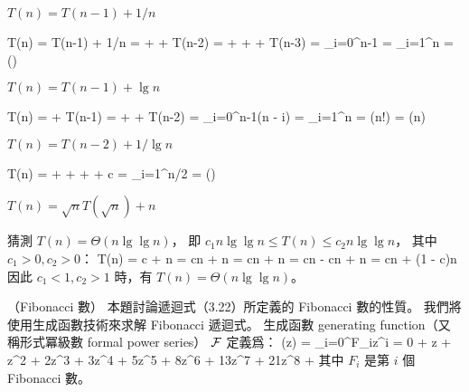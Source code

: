 \item $T(n) = T(n - 1) + 1/n$

\startANSWER
\startformula\startmathalignment
\NC T(n) \NC= T(n-1) + 1/n \NR
\NC      \NC=  +  + T(n-2) \NR
\NC      \NC=  +  +  + T(n-3) \NR
\NC      \NC= \sum_{i=0}^{n-1} \NR
\NC      \NC= \sum_{i=1}^n \NR
\NC      \NC= \Theta()
\stopmathalignment\stopformula
\stopANSWER

\item $T(n) = T(n - 1) + \lg{n}$

\startANSWER
\startformula\startmathalignment
\NC T(n) \NC=  + T(n-1) \NR
\NC      \NC=  +  + T(n-2) \NR
\NC      \NC= \sum_{i=0}^{n-1}\lg(n - i) \NR
\NC      \NC= \sum_{i=1}^{n} \NR
\NC      \NC= \lg(n!) \NR
\NC      \NC= \Theta(n) \qquad {} \NR
\stopmathalignment\stopformula
\stopANSWER

\item $T(n) = T(n - 2) + 1/\lg n$

\startANSWER
\startformula\startmathalignment
\NC T(n) \NC=  +  + \cdots +  + c\NR
\NC      \NC= \sum_{i=1}^{n/2} \NR
\NC      \NC= \Theta(\lg{}) \NR
\stopmathalignment\stopformula
\stopANSWER

\item $T(n) = \sqrt{n}T(\sqrt{n}) + n$

\startANSWER
猜測 $T(n)=\Theta(n\lg\lg n)$，
即 $c_1 n\lg\lg n\le T(n) \le c_2 n\lg\lg{n}$，
其中 $c_1>0,c_2>0$：
\startformula\startmathalignment
\NC T(n) \NC= c\lg\lg{} + n \NR
\NC      \NC= cn\lg\lg{} + n \NR
\NC      \NC= cn\lg{} + n \NR
\NC      \NC= cn\lg{} - cn + n \NR
\NC      \NC= cn\lg{} + (1 - c)n \NR
\stopmathalignment\stopformula
因此 $c_1<1,c_2>1$ 時，有 $T(n)=\Theta(n\lg\lg n)$。
\stopANSWER

\stopigBase
\stopPROBLEM

 （Fibonacci 數）
本題討論遞迴式（3.22）所定義的 Fibonacci 數的性質。
我們將使用生成函數技術來求解 Fibonacci 遞迴式。
{\EMP 生成函數 generating function}（又稱{\EMP 形式冪級數 formal power series}） ${\cal F}$ 定義爲：
\startformula\startmathalignment
{}(z) \NC= \sum_{i=0}^{\infty}F_iz^i \NR
\NC                \NC= 0 + z + z^2 + 2z^3 + 3z^4 + 5z^5 + 8z^6 + 13z^7 + 21z^8 + \cdots \NR
\stopmathalignment\stopformula
其中 $F_i$ 是第 $i$ 個 Fibonacci 數。

